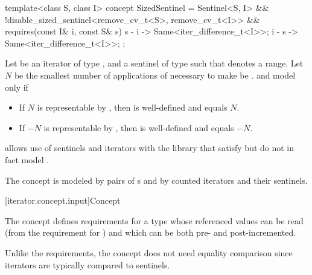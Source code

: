 \begin{itemdecl}
template<class S, class I>
  concept SizedSentinel =
    Sentinel<S, I> &&
    !disable_sized_sentinel<remove_cv_t<S>, remove_cv_t<I>> &&
    requires(const I& i, const S& s) {
      { s - i } -> Same<iter_difference_t<I>>;
      { i - s } -> Same<iter_difference_t<I>>;
    };
\end{itemdecl}

\begin{itemdescr}
\pnum
Let  be an iterator of type , and 
a sentinel of type  such that  denotes a range.
Let $N$ be the smallest number of applications of 
necessary to make  be .
 and  model  only if

\begin{itemize}
\item If $N$ is representable by ,
      then  is well-defined and equals $N$.

\item If $-N$ is representable by ,
      then  is well-defined and equals $-N$.
\end{itemize}
\end{itemdescr}

\pnum
\begin{note}
 allows use of sentinels and iterators with
the library that satisfy but do not in fact model .
\end{note}

\pnum
\begin{example}
The  concept is modeled by pairs of
s and by
counted iterators and their sentinels.
\end{example}

[iterator.concept.input]{Concept }

\pnum
The  concept defines requirements for a type
whose referenced values can be read (from the requirement for
) and which can be both pre- and
post-incremented.
\begin{note}
Unlike the  requirements,
the  concept does not need
equality comparison since iterators are typically compared to sentinels.
\end{note}

